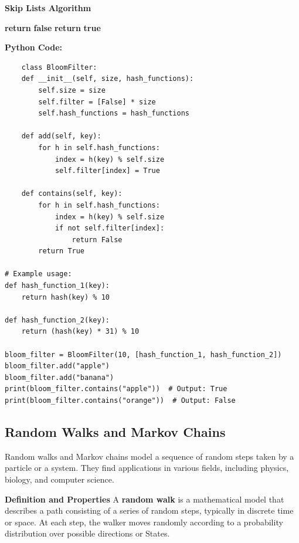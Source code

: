 \documentclass[12pt]{book} %
\begin{document}
\textbf{Skip Lists Algorithm}
\FloatBarrier
\begin{algorithm}[H]
\caption{Bloom Filter Membership Test}
\begin{algorithmic}[1]
            \State \textbf{return} \textbf{false}
        \EndIf
    \EndFor
    \State \textbf{return} \textbf{true}
\EndFunction
\end{algorithmic}
\end{algorithm}
\FloatBarrier
\textbf{Python Code:}
\FloatBarrier
\begin{lstlisting}
    class BloomFilter:
    def __init__(self, size, hash_functions):
        self.size = size
        self.filter = [False] * size
        self.hash_functions = hash_functions

    def add(self, key):
        for h in self.hash_functions:
            index = h(key) % self.size
            self.filter[index] = True

    def contains(self, key):
        for h in self.hash_functions:
            index = h(key) % self.size
            if not self.filter[index]:
                return False
        return True

# Example usage:
def hash_function_1(key):
    return hash(key) % 10

def hash_function_2(key):
    return (hash(key) * 31) % 10

bloom_filter = BloomFilter(10, [hash_function_1, hash_function_2])
bloom_filter.add("apple")
bloom_filter.add("banana")
print(bloom_filter.contains("apple"))  # Output: True
print(bloom_filter.contains("orange"))  # Output: False
\end{lstlisting}

\subsection{Random Walks and Markov Chains}
Random walks and Markov chains model a sequence of random steps taken by a particle or a system. They find applications in various fields, including physics, biology, and computer science.

\textbf{Definition and Properties}
A \textbf{random walk} is a mathematical model that describes a path consisting of a series of random steps, typically in discrete time or space. At each step, the walker moves randomly according to a probability distribution over possible directions or States.
\end{document}
